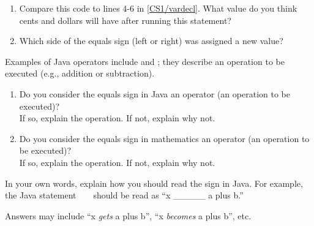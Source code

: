 \begin{enumerate}
\item Compare this code to lines 4-6 in \ref{CS1/vardecl}.
What value do you think cents and dollars will have after running this statement?


\item Which side of the equals sign (left or right) was assigned a new value?

\end{enumerate}


\Q Examples of Java operators include \java{+} and \java{-}; they describe an operation to be executed (e.g., addition or subtraction).

\begin{enumerate}
\item Do you consider the equals sign in Java an operator (an operation to be executed)?
\\ If so, explain the operation. If not, explain why not.


\item Do you consider the equals sign in mathematics an operator (an operation to be executed)?
\\ If so, explain the operation. If not, explain why not.

\end{enumerate}


\Q In your own words, explain how you should read the \java{=} sign in Java.
For example, the Java statement ~  ~ should be read as ``x \_\_\_\_\_ a plus b.''

\begin{answer}
Answers may include ``x \emph{gets} a plus b'', ``x \emph{becomes} a plus b'', etc.
\end{answer}
